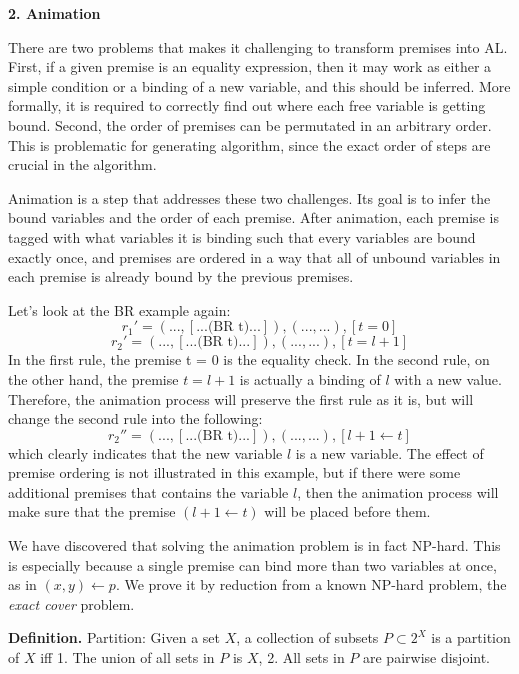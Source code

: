 

\textbf{2. Animation}

There are two problems that makes it challenging to transform premises into AL.
First, if a given premise is an equality expression, then it may work as either a simple condition or
a binding of a new variable, and this should be inferred. More formally, it is required to
correctly find out where each free variable is getting bound. Second, the order
of premises can be permutated in an arbitrary order. This is problematic for
generating algorithm, since the exact order of steps are crucial in the algorithm.

Animation is a step that addresses these two challenges. Its goal is to infer
the bound variables and the order of each premise.
After animation, each premise is tagged with what variables it is binding
such that every variables are bound exactly once, and premises are ordered in a way that
all of unbound variables in each premise is already bound by the previous premises.

Let's look at the BR example again:
\[
r_1' = (..., [... \text{(BR t)} ...]),  (..., ...), [t = 0]
\]
\[
r_2' = (..., [... \text{(BR t)} ...]),  (..., ...), [t = l + 1]
\]
In the first rule, the premise t = 0 is the equality check.
In the second rule, on the other hand, the premise $t = l+1$ is actually a binding of $l$ with a new value.
Therefore, the animation process will preserve the first rule as it is, but will change the
second rule into the following:
\[
r_2'' = (..., [... \text{(BR t)} ...]),  (..., ...), [l + 1 \leftarrow t]
\]
which clearly indicates that the new variable $l$ is a new variable.
The effect of premise ordering is not illustrated in this example, but
if there were some additional premises that contains the variable $l$, then
the animation process will make sure that the premise $(l + 1 \leftarrow t)$ will be
placed before them.

We have discovered that solving the animation problem is in fact NP-hard.
This is especially because a single premise can bind more than two variables at once, as in
$(x,y) \leftarrow p$.
We prove it by reduction from a known NP-hard problem, the \textit{exact cover} problem.

\textbf{Definition.} Partition: Given a set $X$, a collection of subsets $P \subset 2^X$ is a partition of $X$ iff
1. The union of all sets in $P$ is $X$,
2. All sets in $P$ are pairwise disjoint.

